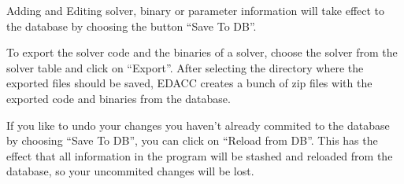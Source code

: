 Adding and Editing solver, binary or parameter information will take effect to the database by choosing the button ``Save To DB''.

To export the solver code and the binaries of a solver, choose the solver from the solver table and click on ``Export''. After selecting the directory where the exported files should be saved, EDACC creates a bunch of zip files with the exported code and binaries from the database.

If you like to undo your changes you haven't already commited to the database by choosing ``Save To DB'', you can click on ``Reload from DB''. This has the effect that all information in the program will be stashed and reloaded from the database, so your uncommited changes will be lost.